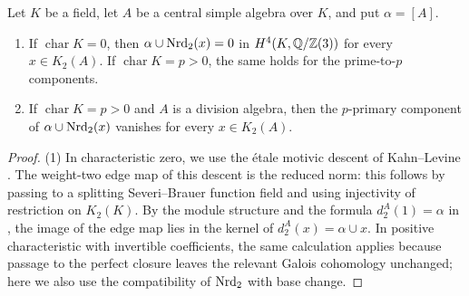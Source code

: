 \begin{lemma}\label{lem:second-three-containment}
Let $K$ be a field, let $A$ be a central simple algebra over $K$, and put $\alpha=[A]$.
\begin{enumerate}
\item If $\operatorname{char}K=0$, then $\alpha\cup\operatorname{Nrd}_2(x)=0$ in $H^4(K,\mathbb Q/\mathbb Z(3))$ for every $x\in K_2(A)$.
If $\operatorname{char}K=p>0$, the same holds for the prime-to-$p$ components.
\item If $\operatorname{char}K=p>0$ and $A$ is a division algebra, then the $p$-primary component of $\alpha\cup\operatorname{Nrd}_2(x)$ vanishes for every $x\in K_2(A)$.
\end{enumerate}
\end{lemma}
\begin{proof}
(1) In characteristic zero, we use the \'etale motivic descent of Kahn--Levine \cite[\S6.9]{KahnLevine2010}.
The weight-two edge map of this descent is the reduced norm: this follows by passing to a splitting Severi--Brauer function field and using injectivity of restriction on $K_2(K)$.
By the module structure and the formula $d_2^A(1)=\alpha$ in \cite[Proposition 6.9.1]{KahnLevine2010}, the image of the edge map lies in the kernel of $d_2^A(x)=\alpha\cup x$.
In positive characteristic with invertible coefficients, the same calculation applies because passage to the perfect closure leaves the relevant Galois cohomology unchanged; here we also use the compatibility of $\operatorname{Nrd}_2$ with base change.


\end{proof}

